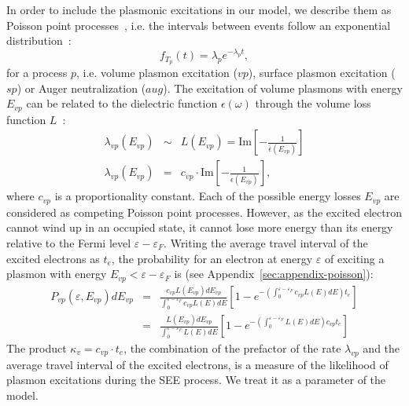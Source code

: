 \begin{refsection}
In order to include the plasmonic excitations in our model, we describe 
them as Poisson point processes~\cite{Egerton2009}, i.e. the intervals between events follow an 
exponential distribution~\cite{MITopencourseware}: 
\begin{equation} 
f_{T_p} (t) = \lambda_p e^{-\lambda_p t}, 
\end{equation} 
for a process $p$, i.e. volume plasmon excitation ($vp$), surface plasmon 
excitation ($sp$) or Auger neutralization ($aug$). The 
excitation of volume plasmons with energy $E_{vp}$ can be related to the 
dielectric function $\epsilon (\omega)$ through the volume loss function 
$L$~\cite{Raether1980}: 
\begin{eqnarray} 
\lambda_{vp}(E_{vp}) &\sim& L(E_{vp}) =
\text{Im}\left[-\frac{1}{\epsilon(E_{vp})}\right] \\
\lambda_{vp}(E_{vp}) &=& c_{vp} \cdot \text{Im}\left[-\frac{1}{\epsilon(E_{vp})}\right],
\end{eqnarray} 
where $c_{vp}$ is a proportionality constant.
Each of the possible energy losses $E_{vp}$ are considered as competing Poisson 
point processes. However, as the excited electron cannot wind up in an 
occupied state, it cannot lose more energy than its energy relative to the 
Fermi level $\varepsilon - \varepsilon_F$. Writing the average travel 
interval of the excited electrons as $t_e$, the probability for an electron at 
energy $\varepsilon$ of exciting a plasmon with energy $E_{vp} < \varepsilon - 
\varepsilon_F$ is (see Appendix~\ref{sec:appendix-poisson}): 
\begin{eqnarray} \label{quotas:eq-vp_prob}
P_{vp}(\varepsilon, E_{vp}) dE_{vp} &=& \frac{c_{vp} 
L(E_{vp})dE_{vp}}{\int_0^{\varepsilon - \varepsilon_F} c_{vp} L(E) dE
}\left[1-e^{-\left(\int_0^{\varepsilon - \varepsilon_F} c_{vp} L(E) dE\right) t_e 
}\right] \\ 
&=& \frac{L(E_{vp})dE_{vp}}{\int_0^{\varepsilon - \varepsilon_F} L(E) dE
}\left[1-e^{-\left(\int_0^{\varepsilon - \varepsilon_F} L(E) dE\right) c_{vp} t_e 
}\right] 
\end{eqnarray} 
The product $\kappa_v = c_{vp} \cdot t_e$, the combination of the prefactor of the 
rate $\lambda_{vp}$ and the average travel interval of the excited electrons, is a 
measure of the likelihood of plasmon excitations during the SEE process. We 
treat it as a parameter of the model. 
 

\end{refsection}
